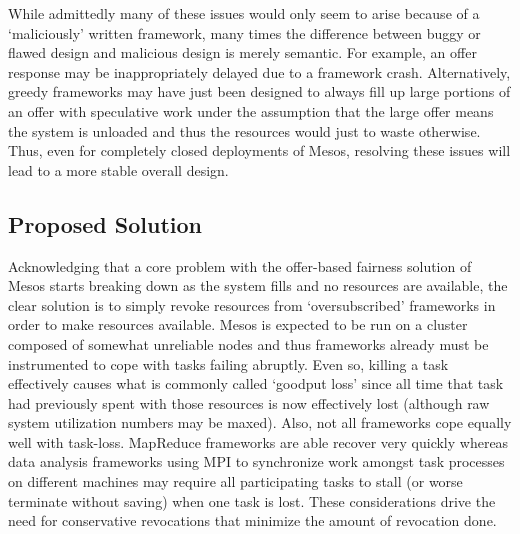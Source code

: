 While admittedly many of these issues would only seem to arise because of a `maliciously' written framework, many times the difference between buggy or flawed design and malicious design is merely semantic. For example, an offer response may be inappropriately delayed due to a framework crash. Alternatively, greedy frameworks may have just been designed to always fill up large portions of an offer with speculative work under the assumption that the large offer means the system is unloaded and thus the resources would just to waste otherwise. Thus, even for completely closed deployments of Mesos, resolving these issues will lead to a more stable overall design. 

\subsection{Proposed Solution}
Acknowledging that a core problem with the offer-based fairness solution of Mesos starts breaking down as the system fills and no resources are available, the clear solution is to simply revoke resources from `oversubscribed' frameworks in order to make resources available. Mesos is expected to be run on a cluster composed of somewhat unreliable nodes and thus frameworks already must be instrumented to cope with tasks failing abruptly. Even so, killing a task effectively causes what is commonly called `goodput loss' since all time that task had previously spent with those resources is now effectively lost (although raw system utilization numbers may be maxed). Also, not all frameworks cope equally well with task-loss. MapReduce frameworks are able recover very quickly whereas data analysis frameworks using MPI to synchronize work amongst task processes on different machines may require all participating tasks to stall (or worse terminate without saving) when one task is lost. These considerations drive the need for conservative revocations that minimize the amount of revocation done.

